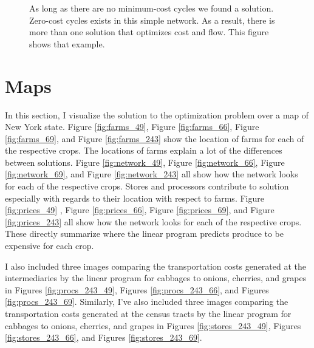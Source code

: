 \documentclass{report}
\begin{document}
\begin{figure}[!htb]
\centering
\begin{framed}
\caption{As long as there are no minimum-cost cycles we found a solution. Zero-cost cycles exists in this simple network. As a result, there is more than one solution that optimizes cost and flow. This figure shows that example.}
\label{fig:example6}
\end{framed}
\end{figure}

\section{Maps}

In this section, I visualize the solution to the optimization problem over a map of New York state. Figure \ref{fig:farms_49}, Figure \ref{fig:farms_66}, Figure \ref{fig:farms_69}, and Figure \ref{fig:farms_243} show the location of farms for each of the respective crops. The locations of farms explain a lot of the differences between solutions. Figure \ref{fig:network_49}, Figure \ref{fig:network_66}, Figure \ref{fig:network_69}, and Figure \ref{fig:network_243} all show how the network looks for each of the respective crops. Stores and processors contribute to solution especially with regards to their location with respect to farms.  Figure \ref{fig:prices_49} , Figure \ref{fig:prices_66}, Figure \ref{fig:prices_69}, and Figure \ref{fig:prices_243} all show how the network looks for each of the respective crops. These directly summarize where the linear program predicts produce to be expensive for each crop.

I also included three images comparing the transportation costs generated at the intermediaries by the linear program for cabbages to onions, cherries, and grapes in Figures \ref{fig:procs_243_49}, Figures \ref{fig:procs_243_66}, and Figures \ref{fig:procs_243_69}. Similarly, I've also included three images comparing the transportation costs generated at the census tracts by the linear program for cabbages to onions, cherries, and grapes in Figures \ref{fig:stores_243_49}, Figures \ref{fig:stores_243_66}, and Figures \ref{fig:stores_243_69}.
\end{document}
